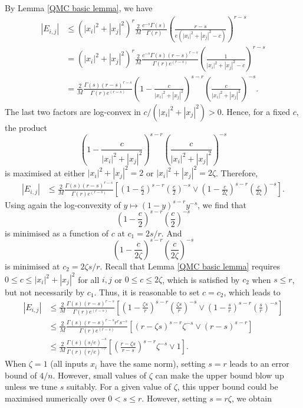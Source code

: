 \documentclass{article}
\theoremstyle{plain}
\theoremstyle{definition}
\theoremstyle{remark}
\newcommand{\eq}[1]{\begin{align*}#1\end{align*}}
\begin{document}
By Lemma \ref{QMC basic lemma}, we have
\eq{
|E_{i,j} |
&\leq ( | x_i | ^2+ | x_j | ^2)^r \frac{2}{M} \frac{c^{-s}\Gamma(s)}{\Gamma(r)} \left(\frac{r-s}{e( | x_i | ^2+ | x_j | ^2-c)}\right)^{r-s} \\
&= ( | x_i | ^2+ | x_j | ^2)^r \frac{2}{M} \frac{c^{-s}\Gamma(s)(r-s)^{r-s}}{\Gamma(r)e^{(r-s)}} \left(\frac{1}{ | x_i | ^2+ | x_j | ^2-c}\right)^{r-s} \\
&= \frac{2}{M} \frac{\Gamma(s)(r-s)^{r-s}}{\Gamma(r)e^{(r-s)}} \left(1-\frac{c}{ | x_i | ^2+ | x_j | ^2}\right)^{s-r} \left(\frac{c}{ | x_i | ^2+ | x_j | ^2}\right)^{-s} .
} 
The last two factors are log-convex in $c/( | x_i | ^2+ | x_j | ^2)>0$. Hence, for a fixed $c$, the product
$$\left(1-\frac{c}{ | x_i | ^2+ | x_j | ^2}\right)^{s-r} \left(\frac{c}{ | x_i | ^2+ | x_j | ^2}\right)^{-s} $$
 is maximised at either $ | x_i | ^2+ | x_j | ^2=2$ or $ | x_i | ^2+ | x_j | ^2=2\zeta$. Therefore,
\eq{
|E_{i,j}|
&\leq \frac{2}{M} \frac{\Gamma(s)(r-s)^{r-s}}{\Gamma(r)e^{(r-s)}} \left[\left(1-\frac{c}{2}\right)^{s-r} \left(\frac{c}{2}\right)^{-s} \vee \left(1-\frac{c}{2\zeta}\right)^{s-r} \left(\frac{c}{2\zeta}\right)^{-s}\right].
} 
Using again the log-convexity of $y\mapsto (1-y)^{s-r} y^{-s}$, we find that 
$$\left(1-\frac{c}{2}\right)^{s-r} \left(\frac{c}{2}\right)^{-s} $$
is minimised as a function of $c$ at $c_1 = 2s/r$. And
$$\left(1-\frac{c}{2\zeta}\right)^{s-r} \left(\frac{c}{2\zeta}\right)^{-s}$$
is minimised at $c_2 = 2\zeta s/r$. Recall that Lemma \ref{QMC basic lemma} requires $0\le c\leq  | x_i | ^2+ | x_j | ^2$ for all $i,j$ or $0\le c\leq 2\zeta$, which is satisfied by $c_2$ when $s\le r$, but not necessarily by $c_1$. Thus, it is reasonable to set $c=c_2$, which leads to
\eq{
|E_{i,j}| 
&\leq \frac{2}{M} \frac{\Gamma(s)(r-s)^{r-s}}{\Gamma(r)e^{(r-s)}} \left[\left(1-\frac{\zeta s}{r}\right)^{s-r} \left(\frac{\zeta s}{r}\right)^{-s} \vee \left(1- \frac{s}{r}\right)^{s-r} \left( \frac{s}{r}\right)^{-s}\right] \\
&\leq \frac{2}{M} \frac{\Gamma(s)(r-s)^{r-s}r^{r}s^{-s}}{\Gamma(r)e^{(r-s)}} \left[\left(r-\zeta s\right)^{s-r} \zeta^{-s} \vee \left(r- s\right)^{s-r} \right] \\
&\leq \frac{2}{M} \frac{\Gamma(s)(s/e)^{-s}}{\Gamma(r)(r/e)^{-r}} \left[\left(\frac{r-\zeta s}{r-s}\right)^{s-r} \zeta^{-s} \vee 1 \right] .
} 
When $\zeta=1$ (all inputs $x_i$ have the same norm), setting $s=r$ leads to an  error bound of $4/n$. However, small values of $\zeta$ can make the upper bound blow up unless we tune $s$ suitably. For a given value of $\zeta$, this upper bound could be maximised numerically over $0<s\le r$. However, setting $s = r\zeta$, we obtain
\end{document}

